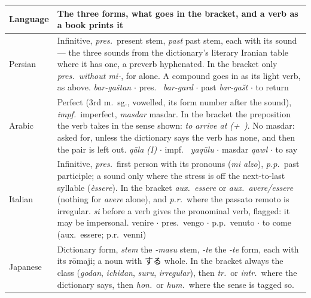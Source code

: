 \documentclass[11pt,oneside]{report}
\newcommand{\pw}[1]{\babelsublr{\mbox{\foreignlanguage{persian}{#1}}}}
\newcommand{\aw}[1]{\babelsublr{\mbox{\foreignlanguage{arabic}{#1}}}}
\newcommand{\jw}[1]{\mbox{\foreignlanguage{japanese}{#1}}}
\newcommand{\iw}[1]{\foreignlanguage{italian}{\emph{#1}}}
\begin{document}
\begin{center}
\small
\begin{longtable}{@{}>{\raggedright\arraybackslash}p{}>{\raggedright\arraybackslash}p{}@{}}
\toprule
\textsf{Language} & \textsf{The three forms, what goes in the bracket, and a verb as a book prints it} \\
\midrule
\endhead
\textsf{Persian} & Infinitive, \emph{pres.}\ present stem, \emph{past} past
  stem, each with its sound --- the three sounds from the dictionary's
  literary Iranian table where it has one, a preverb hyphenated. In the
  bracket only \emph{pres.\ without mi-}, for \pw{داشتن} alone. A compound
  goes in as its light verb, as above. \newline
  \pw{برگشتن} \emph{bar-gaštan} $\cdot$ pres.\ \pw{برگرد} \emph{bar-gard}
  $\cdot$ past \pw{برگشت} \emph{bar-gašt} $\cdot$ to return \\
\addlinespace
\textsf{Arabic} & Perfect (3rd m.\ sg., vowelled, its form number after the
  sound), \emph{impf.}\ imperfect, \emph{masdar} masdar. In the bracket the
  preposition the verb takes in the sense shown: \emph{to arrive at
  (+~\aw{إِلَى})}. No masdar: asked for, unless the dictionary says the verb
  has none, and then the pair is left out. \newline
  \aw{قَالَ} \emph{qāla (I)} $\cdot$ impf.\ \aw{يَقُولُ} \emph{yaqūlu}
  $\cdot$ masdar \aw{قَوْل} \emph{qawl} $\cdot$ to say \\
\addlinespace
\textsf{Italian} & Infinitive, \emph{pres.}\ first person with its pronouns
  (\iw{mi alzo}), \emph{p.p.}\ past participle; a sound only where the stress
  is off the next-to-last syllable (\iw{èssere}). In the bracket \emph{aux.\
  essere} or \emph{aux.\ avere/essere} (nothing for \iw{avere} alone), and
  \emph{p.r.}\ where the passato remoto is irregular. \iw{si} before a verb
  gives the pronominal verb, flagged: it may be impersonal. \newline
  venire $\cdot$ pres.\ vengo $\cdot$ p.p.\ venuto $\cdot$ to come (aux.\
  essere; p.r.\ venni) \\
\addlinespace
\textsf{Japanese} & Dictionary form, \emph{stem} the \emph{-masu} stem,
  \emph{-te} the \emph{-te} form, each with its r\=omaji; a noun with
  \jw{する} whole. In the bracket always the class (\emph{godan},
  \emph{ichidan}, \emph{suru}, \emph{irregular}), then \emph{tr.}\ or
  \emph{intr.}\ where the dictionary says, then \emph{hon.}\ or \emph{hum.}\
  where the sense is tagged so. \newline

\end{longtable}
\end{center}
\end{document}
